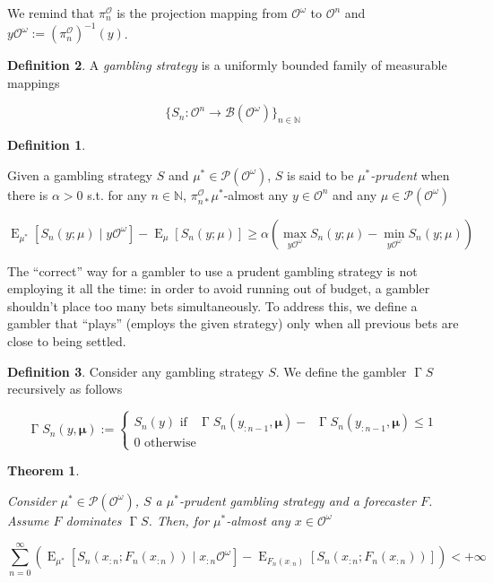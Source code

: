 \documentclass[11pt]{article}
\theoremstyle{definition}
\newtheorem{definition}{Definition}%
\theoremstyle{plain}
\newtheorem{theorem}{Theorem}%
\newcommand{\Nats}{\mathbb{N}}
\newcommand{\Sq}[2]{\{#1\}_{#2 \in \Nats}}
\newcommand{\Sqn}[1]{\Sq{#1}{n}}
\DeclareMathOperator{\E}{E}
\newcommand{\PM}{\mathcal{P}}
\newcommand{\Ob}{\mathcal{O}}
\newcommand{\OO}{\Ob^\omega}
\newcommand{\PO}{\pi^\Ob}
\newcommand{\PMO}{\PM(\OO)}
\newcommand{\Gm}{\mathcal{B}}
\newcommand{\GMO}{\Gm(\OO)}
\DeclareMathOperator{\SVM}{\Sigma V_{\min}}
\DeclareMathOperator{\SVX}{\Sigma V_{\max}}
\DeclareMathOperator{\PG}{\Gamma}
\newcommand{\BM}{\bm{\mu}}
\begin{document}
We remind that $\PO_n$ is the projection mapping from $\OO$ to $\Ob^n$ and $y\OO:= (\PO_{n})^{-1}(y)$.

\begin{definition}

A \emph{gambling strategy} is a uniformly bounded family of measurable mappings

\[\Sqn{S_n: \Ob^n \rightarrow \GMO}\]

\begin{definition}
\label{def:prudent}

Given a gambling strategy $S$ and $\mu^* \in \PMO$, $S$ is said to be \emph{$\mu^*$-prudent} when there is $\alpha > 0$ s.t. for any $n \in \Nats$, $\PO_{n*} \mu^*$-almost any $y \in \Ob^n$ and any $\mu \in \PMO$

\begin{equation}
\E_{\mu^*}[S_n(y; \mu) \mid y\OO] - \E_\mu[S_n(y; \mu)] \geq \alpha (\max_{y\OO}{S_n(y; \mu)} - \min_{y\OO}{S_n(y; \mu)})
\end{equation}

\end{definition}

\end{definition}

The \enquote{correct} way for a gambler to use a prudent gambling strategy is not employing it all the time: in order to avoid running out of budget, a gambler shouldn’t place too many bets simultaneously. To address this, we define a gambler that \enquote{plays} (employs the given strategy) only when all previous bets are close to being settled.

\begin{definition}

Consider any gambling strategy $S$. We define the gambler $\PG{S}$ recursively as follows

\begin{equation}
\PG{S}_n(y,\BM):=\begin{cases} S_n(y) \text{ if } {\SVX{\PG{S}}_n(y_{:n-1},\BM)}-{\SVM{\PG{S}}_n(y_{:n-1},\BM)} \leq 1 \\ 0 \text{ otherwise} \end{cases}
\end{equation}

\end{definition}

\begin{theorem}
\label{thm:prudent}

Consider $\mu^* \in \PMO$, $S$ a $\mu^*$-prudent gambling strategy and a forecaster $F$. Assume $F$ dominates $\PG{S}$. Then, for $\mu^*$-almost any $x \in \OO$

\begin{equation}
\label{eqn:thm_prudent}
\sum_{n=0}^\infty (\E_{\mu^*}[S_n(x_{:n};F_n(x_{:n})) \mid x_{:n}\OO]-\E_{F_n(x_{:n})}[S_n(x_{:n};F_n(x_{:n}))]) < +\infty
\end{equation}

\end{theorem}
\end{document}
